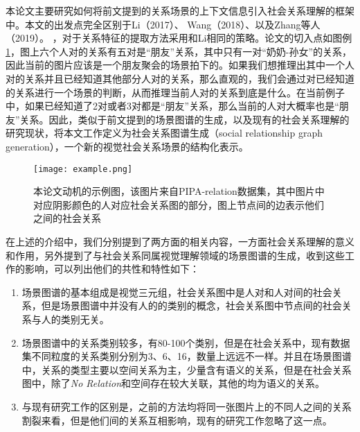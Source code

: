 本论文主要研究如何将前文提到的关系场景的上下文信息引入社会关系理解的框架中。本文的出发点完全区别于Li（2017）\cite{li2017dual-glance}、
Wang（2018）\cite{wang2018deep}、以及Zhang等人（2019）\cite{zhang2019multi}。
，对于关系特征的提取方法采用和Li\cite{li2017dual-glance}相同的策略。论文的切入点如图例\ref{fig:intro-example-2}，图上六个人对的关系有五对是``朋友''关系，其中只有一对``奶奶-孙女''的关系，因此当前的图片应该是一个朋友聚会的场景拍下的。如果我们想推理出其中一个人对的关系并且已经知道其他部分人对的关系，那么直观的，我们会通过对已经知道的关系进行一个场景的判断，从而推理当前人对的关系到底是什么。在当前例子中，如果已经知道了2对或者3对都是``朋友''关系，那么当前的人对大概率也是``朋友''关系。因此，类似于前文提到的场景图谱的生成，以及现有的社会关系理解的研究现状，将本文工作定义为社会关系图谱生成（social relationship graph generation），一个新的视觉社会关系场景的结构化表示。
\begin{figure}[htpb]
	\centering
	\texttt{[image: example.png]}
    \caption{本论文动机的示例图，该图片来自PIPA-relation数据集，其中图片中对应阴影颜色的人对应社会关系图的部分，图上节点间的边表示他们之间的社会关系}
	\vspace*{-3.5mm}
	\label{fig:intro-example-2}
\end{figure}

在上述的介绍中，我们分别提到了两方面的相关内容，一方面社会关系理解的意义和作用，另外提到了与社会关系同属视觉理解领域的场景图谱的生成，收到这些工作的影响，可以列出他们的共性和特性如下：
\begin{enumerate}
    \item 场景图谱的基本组成是视觉三元组，社会关系图中是人对和人对间的社会关系，但是场景图谱中并没有人的的类别的概念，社会关系图中节点间的社会关系与人的类别无关。
    \item 场景图谱中的关系类别较多，有80-100个类别，但是在社会关系中，现有数据集不同粒度的关系类别分别为3、6、16，数量上远远不一样。并且在场景图谱中，关系的类型主要以空间关系为主，少量含有语义的关系，但是在社会关系图中，除了{\it No Relation}和空间存在较大关联，其他的均为语义的关系。
    \item 与现有研究工作的区别是，之前的方法均将同一张图片上的不同人之间的关系割裂来看，但是他们间的关系互相影响，现有的研究工作忽略了这一点。
\end{enumerate}

